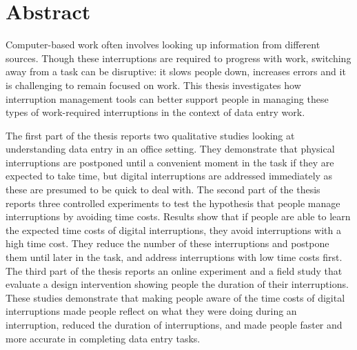 \section*{Abstract}
Computer-based work often involves looking up information from different sources. Though these interruptions are required to progress with work, switching away from a task can be disruptive: it slows people down, increases errors and it is challenging to remain focused on work. This thesis investigates how interruption management tools can better support people in managing these types of work-required interruptions in the context of data entry work.

The first part of the thesis reports two qualitative studies looking at understanding data entry in an office setting. They demonstrate that physical interruptions are postponed until a convenient moment in the task if they are expected to take time, but digital interruptions are addressed immediately as these are presumed to be quick to deal with. The second part of the thesis reports three controlled experiments to test the hypothesis that people manage interruptions by avoiding time costs. Results show that if people are able to learn the expected time costs of digital interruptions, they avoid interruptions with a high time cost. They reduce the number of these interruptions and postpone them until later in the task, and address interruptions with low time costs first. The third part of the thesis reports an online experiment and a field study that evaluate a design intervention showing people the duration of their interruptions. These studies demonstrate that making people aware of the time costs of digital interruptions made people reflect on what they were doing during an interruption, reduced the duration of interruptions, and made people faster and more accurate in completing data entry tasks.

